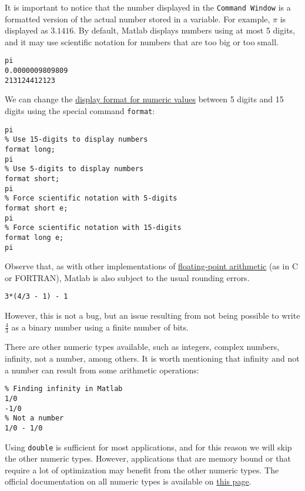 \documentclass[12pt, a4paper]{article}
\begin{document}
It is important to notice that the number displayed in the \texttt{Command Window} is a formatted version of the actual number stored in a variable.
For example, \(\pi\) is displayed as \(3.1416\).
By default, Matlab displays numbers using at most 5 digits, and it may use scientific notation for numbers that are too big or too small.
\lstset{language=matlab,label= ,caption= ,captionpos=b,firstnumber=1,numbers=left,style=Matlab-editor}
\begin{lstlisting}
pi
0.0000009809809
213124412123
\end{lstlisting}
We can change the \href{https://www.mathworks.com/help/matlab/matlab\_prog/display-format-for-numeric-values.html}{display format for numeric values} between 5 digits and 15 digits using the special command \texttt{format}:
\lstset{language=matlab,label= ,caption= ,captionpos=b,firstnumber=1,numbers=left,style=Matlab-editor}
\begin{lstlisting}
pi
% Use 15-digits to display numbers
format long;
pi
% Use 5-digits to display numbers
format short;
pi
% Force scientific notation with 5-digits
format short e;
pi
% Force scientific notation with 15-digits
format long e;
pi
\end{lstlisting}

Observe that, as with other implementations of \href{https://en.wikipedia.org/wiki/IEEE\_754}{floating-point arithmetic} (as in C or FORTRAN), Matlab is also subject to the usual rounding errors.
\lstset{language=matlab,label= ,caption= ,captionpos=b,firstnumber=1,numbers=left,style=Matlab-editor}
\begin{lstlisting}
3*(4/3 - 1) - 1
\end{lstlisting}
However, this is not a bug, but an issue resulting from not being possible to write \(\frac{4}{3}\) as a binary number using a finite number of bits.

There are other numeric types available, such as integers, complex numbers, infinity, not a number, among others.
It is worth mentioning that infinity and not a number can result from some arithmetic operations:
\lstset{language=matlab,label= ,caption= ,captionpos=b,firstnumber=1,numbers=left,style=Matlab-editor}
\begin{lstlisting}
% Finding infinity in Matlab
1/0
-1/0
% Not a number
1/0 - 1/0
\end{lstlisting}

Using \texttt{double} is sufficient for most applications, and for this reason we will skip the other numeric types.
However, applications that are memory bound or that require a lot of optimization may benefit from the other numeric types.
The official documentation on all numeric types is available on \href{https://www.mathworks.com/help/matlab/numeric-types.html}{this page}.
\end{document}

